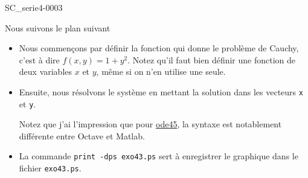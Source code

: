 \begin{corrige}{SC_serie4-0003}

Nous suivons le plan suivant
\begin{itemize}
	\item 
		Nous commençons par définir la fonction qui donne le problème de Cauchy, c'est à dire $f(x,y)=1+y^2$. Notez qu'il faut bien définir une fonction de deux variables $x$ et $y$, même si on n'en utilise une seule.

	\item
		Ensuite, nous résolvons le système en mettant la solution dans les vecteurs \verb+x+ et \verb+y+. 
		
		Notez que j'ai l'impression que pour \href{http://octave.sourceforge.net/doc/f/ode45.html}{ode45}, la syntaxe est notablement différente entre Octave et Matlab.

	\item
		La commande \verb+print -dps exo43.ps+ sert à enregistrer le graphique dans le fichier \verb+exo43.ps+.
\end{itemize}



\end{corrige}

